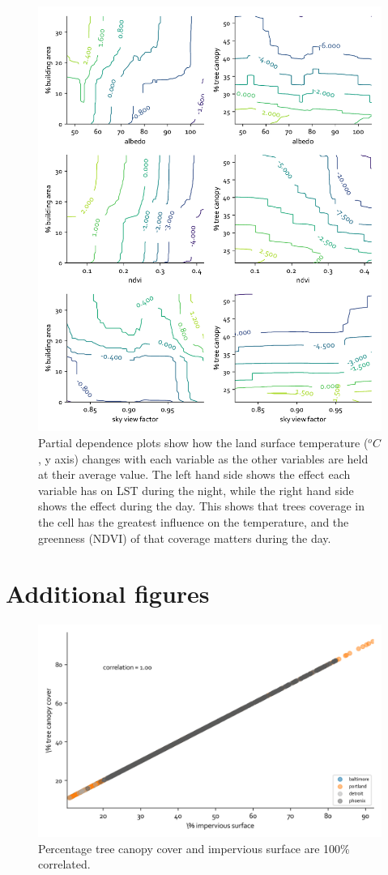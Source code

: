 \documentclass[final,3p,times,twocolumn,sort&compress]{elsarticle}
\begin{document}
\begin{figure}
    \centering
    \includegraphics[width=\linewidth]{fig/report/pdp_2d_day_100.pdf}
    \caption{
    Partial dependence plots show how the land surface temperature ($^oC$, y axis) changes with each variable as the other variables are held at their average value. The left hand side shows the effect each variable has on LST during the night, while the right hand side shows the effect during the day. This shows that trees coverage in the cell has the greatest influence on the temperature, and the greenness (NDVI) of that coverage matters during the day.
    }
    \label{fig:pdp_2dday}
\end{figure}


\newpage
\section{Additional figures}
\begin{figure}
    \centering
    \includegraphics[width=\linewidth]{fig/report/imp_v_tree_500.png}
    \caption{
    Percentage tree canopy cover and impervious surface are 100\% correlated.
    }
    \label{fig:imp_tree}
\end{figure}
\end{document}
